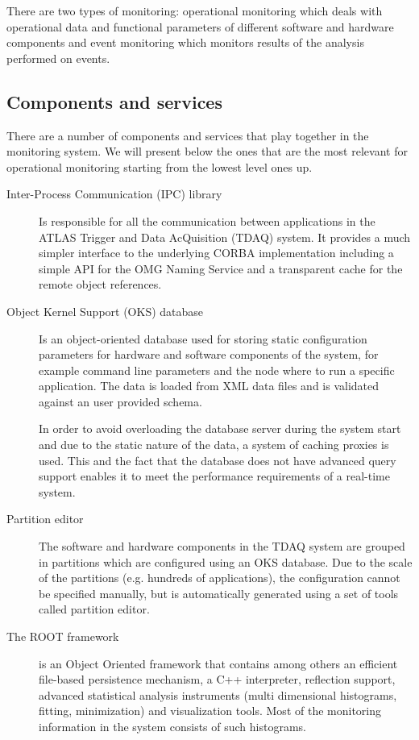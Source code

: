 There are two types of monitoring: operational monitoring which deals with operational data and functional parameters of different software and hardware components and event monitoring which monitors results of the analysis performed on events.

\subsection*{Components and services}

There are a number of components and services that play together in the monitoring system. We will present below the ones that are the most relevant for operational monitoring starting from the lowest level ones up.

\begin{description}
\item[Inter-Process Communication (IPC) library \citep{corso2007data}] Is responsible for all the communication between applications in the ATLAS Trigger and Data AcQuisition (TDAQ) system. It provides a much simpler interface to the underlying CORBA \citep{vinoski1997corba} implementation including a simple API for the OMG Naming Service and a transparent cache for the remote object references.

\item[Object Kernel Support (OKS) database \citep{jones1998oks}\citep{alexandrov2001atlas}] Is an object-oriented database used for storing static configuration parameters for hardware and software components of the system, for example command line parameters and the node where to run a specific application. The data is loaded from XML data files and is validated against an user provided schema. 

In order to avoid overloading the database server during the system start and due to the static nature of the data, a system of caching proxies is used. This and the fact that the database does not have advanced query support enables it to meet the performance requirements of a real-time system.

\item[Partition editor] The software and hardware components in the TDAQ system are grouped in partitions which are configured using an OKS database. Due to the scale of the partitions (e.g. hundreds of applications), the configuration cannot be specified manually, but is automatically generated using a set of tools called partition editor.

\item[The ROOT framework \citep{brun1997root}] is an Object Oriented framework that contains among others an efficient file-based persistence mechanism, a C++ interpreter, reflection support, advanced statistical analysis instruments (multi dimensional histograms, fitting, minimization) and visualization tools. Most of the monitoring information in the system consists of such histograms.


\end{description}

